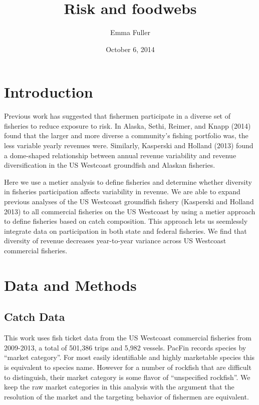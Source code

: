 \documentclass[]{article}
\title{Risk and foodwebs}
\author{Emma Fuller}
\date{October 6, 2014}
\begin{document}
\maketitle


\section{Introduction}\label{introduction}

Previous work has suggested that fishermen participate in a diverse set
of fisheries to reduce exposure to risk. In Alaska, Sethi, Reimer, and
Knapp (2014) found that the larger and more diverse a community's
fishing portfolio was, the less variable yearly revenues were.
Similarly, Kasperski and Holland (2013) found a dome-shaped relationship
between annual revenue variability and revenue diversification in the US
Westcoast groundfish and Alaskan fisheries.

Here we use a metier analysis to define fisheries and determine whether
diversity in fisheries participation affects variability in revenue. We
are able to expand previous analyses of the US Westcoast groundfish
fishery (Kasperski and Holland 2013) to all commercial fisheries on the
US Westcoast by using a metier approach to define fisheries based on
catch composition. This approach lets us seemlessly integrate data on
participation in both state and federal fisheries. We find that
diversity of revenue decreases year-to-year variance across US Westcoast
commercial fisheries.

\section{Data and Methods}\label{data-and-methods}

\subsection{Catch Data}\label{catch-data}

This work uses fish ticket data from the US Westcoast commercial
fisheries from 2009-2013, a total of 501,386 trips and 5,982 vessels.
PacFin records species by ``market category''. For most easily
identifiable and highly marketable species this is equivalent to species
name. However for a number of rockfish that are difficult to
distinguish, their market category is some flavor of ``unspecified
rockfish''. We keep the raw market categories in this analysis with the
argument that the resolution of the market and the targeting behavior of
fishermen are equivalent.
\end{document}
